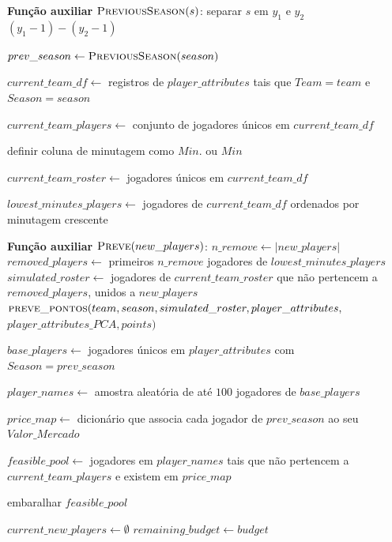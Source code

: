 \begin{breakablealgorithm}
\label{alg:busca_local_first}
\begin{algorithmic}[1]


\Statex \textbf{Função auxiliar} $\textsc{PreviousSeason}(s)$:
\State separar $s$ em $y_1$ e $y_2$
\State \Return $(y_1 - 1)-(y_2 - 1)$

\State $prev\_season \gets \textsc{PreviousSeason}(season)$

\State $current\_team\_df \gets$ registros de $player\_attributes$ tais que $Team = team$ e $Season = season$

\State $current\_team\_players \gets$ conjunto de jogadores únicos em $current\_team\_df$

\State definir coluna de minutagem como $Min.$ ou $Min$

\State $current\_team\_roster \gets$ jogadores únicos em $current\_team\_df$

\State $lowest\_minutes\_players \gets$ jogadores de $current\_team\_df$ ordenados por minutagem crescente

\Statex \textbf{Função auxiliar} $\textsc{Preve}(new\_players)$:
\State $n\_remove \gets |new\_players|$
\State $removed\_players \gets$ primeiros $n\_remove$ jogadores de $lowest\_minutes\_players$
\State $simulated\_roster \gets$ jogadores de $current\_team\_roster$ que não pertencem a $removed\_players$, unidos a $new\_players$
\State \Return $\textsc{preve\_pontos}(team, season, simulated\_roster, player\_attributes,$
\Statex \hspace{\algorithmicindent} $player\_attributes\_PCA, points)$

\State $base\_players \gets$ jogadores únicos em $player\_attributes$ com $Season = prev\_season$

\State $player\_names \gets$ amostra aleatória de até $100$ jogadores de $base\_players$

\State $price\_map \gets$ dicionário que associa cada jogador de $prev\_season$ ao seu $Valor\_Mercado$

\State $feasible\_pool \gets$ jogadores em $player\_names$ tais que não pertencem a $current\_team\_players$ e existem em $price\_map$

\State embaralhar $feasible\_pool$

\State $current\_new\_players \gets \emptyset$
\State $remaining\_budget \gets budget$


\end{algorithmic}
\end{breakablealgorithm}
